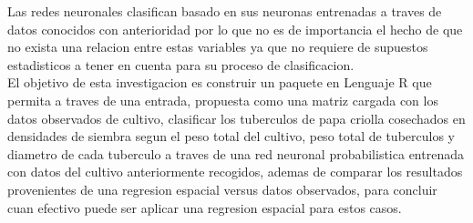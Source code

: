 Las redes neuronales clasifican basado en sus neuronas entrenadas a traves de datos conocidos con anterioridad por lo que no es de importancia el hecho de que no exista una relacion entre estas variables ya que no requiere de supuestos estadisticos a tener en cuenta para su proceso de clasificacion.\\

El objetivo de esta investigacion es construir un paquete en Lenguaje R que permita a traves de una entrada, propuesta como una matriz cargada con los datos observados de cultivo, clasificar los tuberculos de papa criolla cosechados en densidades de siembra segun el peso total del cultivo, peso total de tuberculos y diametro de cada tuberculo a traves de una red neuronal probabilistica entrenada con datos del cultivo anteriormente recogidos, ademas de comparar los resultados provenientes de una regresion espacial versus datos observados, para concluir cuan efectivo puede ser aplicar una regresion espacial para estos casos.\\